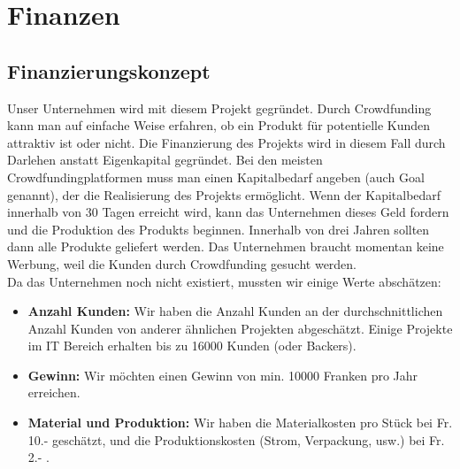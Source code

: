 \chapter{Finanzen}
\label{chap:finanzen}

\section{Finanzierungskonzept}
Unser Unternehmen wird mit diesem Projekt gegr\"undet. Durch Crowdfunding kann man auf einfache Weise erfahren, ob ein Produkt f\"ur potentielle Kunden attraktiv ist oder nicht. Die Finanzierung des Projekts wird in diesem Fall durch Darlehen anstatt Eigenkapital gegr\"undet. Bei den meisten Crowdfundingplatformen muss man einen Kapitalbedarf angeben (auch Goal genannt), der die Realisierung des Projekts erm\"oglicht. Wenn der Kapitalbedarf innerhalb von 30 Tagen erreicht wird, kann das Unternehmen dieses Geld fordern und die Produktion des Produkts beginnen. Innerhalb von drei Jahren sollten dann alle Produkte geliefert werden. Das Unternehmen braucht momentan keine Werbung, weil die Kunden durch Crowdfunding gesucht werden.\\
Da das Unternehmen noch nicht existiert, mussten wir einige Werte absch\"atzen:\\
\begin{itemize}
\item \textbf{Anzahl Kunden:} Wir haben die Anzahl Kunden an der durchschnittlichen Anzahl Kunden von anderer \"ahnlichen Projekten abgesch\"atzt. Einige Projekte im IT Bereich erhalten bis zu 16000 Kunden (oder Backers). 
\item \textbf{Gewinn:} Wir m\"ochten einen Gewinn von min. 10000 Franken pro Jahr erreichen.
\item \textbf{Material und Produktion:} Wir haben die Materialkosten pro St\"uck bei Fr. 10.- gesch\"atzt, und die Produktionskosten (Strom, Verpackung, usw.) bei Fr. 2.- .
\end{itemize}

